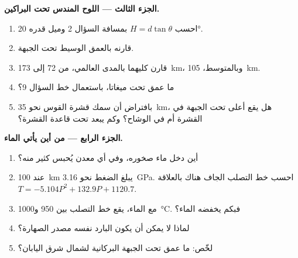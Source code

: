 \begin{problem}
\medskip
\noindent\textbf{الجزء الثالث --- اللوح المندس تحت البراكين.}
\begin{enumerate}[resume]
  \item احسب $H = d\tan\theta$ بمسافة السؤال 2 وميل
        قدره \ang{20}.
  \item قارنه بالعمق الوسيط تحت الجبهة.
  \item قارن كليهما بالمدى العالمي، من 72 إلى \qty{173}{km}، وبالمتوسط،
        \qty{105}{km}.
  \item ما عمق  تحت ميغاتا، باستعمال خط السؤال 9؟
  \item بافتراض أن سمك قشرة القوس نحو \qty{35}{km}، هل يقع
        أعلى  تحت الجبهة في القشرة أم في الوشاح؟ وكم
        يبعد تحت قاعدة القشرة؟
\end{enumerate}

\medskip
\noindent\textbf{الجزء الرابع --- من أين يأتي الماء.}
\begin{enumerate}[resume]
  \item أين دخل ماء  صخوره، وفي أي
        معدن يُحبس كثير منه؟
  \item عند \qty{100}{km} يبلغ الضغط نحو \qty{3.16}{GPa}. احسب
        خط التصلب الجاف هناك بالعلاقة $T = -5.104P^2 + 132.9P + 1120.7$.
  \item مع الماء، يقع خط التصلب بين 950 و\qty{1000}{\celsius}.
        فبكم يخفضه الماء؟
  \item لماذا لا يمكن أن يكون  البارد نفسه مصدر الصهارة؟
  \item لخّص: ما عمق  تحت الجبهة البركانية لشمال شرق
        اليابان؟
\end{enumerate}
\end{problem}
